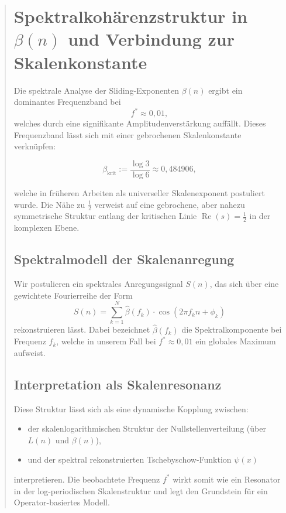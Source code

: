 \documentclass[12pt]{article}
\begin{document}
\begin{quote}
\section{Spektralkohärenzstruktur in $\beta(n)$ und Verbindung zur Skalenkonstante}

Die spektrale Analyse der Sliding-Exponenten $\beta(n)$ ergibt ein dominantes Frequenzband bei
\[
f^* \approx 0{,}01,
\]
welches durch eine signifikante Amplitudenverstärkung auffällt. Dieses Frequenzband lässt sich mit einer gebrochenen Skalenkonstante verknüpfen:

\begin{equation}
\beta_{\text{krit}} := \frac{\log 3}{\log 6} \approx 0{,}484906,
\end{equation}

welche in früheren Arbeiten als universeller Skalenexponent postuliert wurde. Die Nähe zu $\frac{1}{2}$ verweist auf eine gebrochene, aber nahezu symmetrische Struktur entlang der kritischen Linie $\operatorname{Re}(s) = \frac{1}{2}$ in der komplexen Ebene.

\subsection*{Spektralmodell der Skalenanregung}

Wir postulieren ein spektrales Anregungssignal $S(n)$, das sich über eine gewichtete Fourierreihe der Form
\[
S(n) = \sum_{k=1}^{N} \hat{\beta}(f_k) \cdot \cos(2\pi f_k n + \phi_k)
\]
rekonstruieren lässt. Dabei bezeichnet $\hat{\beta}(f_k)$ die Spektralkomponente bei Frequenz $f_k$, welche in unserem Fall bei $f^* \approx 0{,}01$ ein globales Maximum aufweist.

\subsection*{Interpretation als Skalenresonanz}

Diese Struktur lässt sich als eine dynamische Kopplung zwischen:

\begin{itemize}
\item der skalenlogarithmischen Struktur der Nullstellenverteilung (über $L(n)$ und $\beta(n)$),
\item und der spektral rekonstruierten Tschebyschow-Funktion $\psi(x)$
\end{itemize}

interpretieren. Die beobachtete Frequenz $f^*$ wirkt somit wie ein Resonator in der log-periodischen Skalenstruktur und legt den Grundstein für ein Operator-basiertes Modell.
\end{quote}
\end{document}
